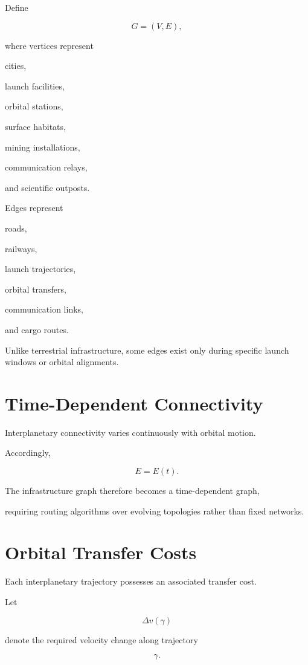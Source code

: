 \documentclass[11pt,fleqn]{book}
\numberwithin{equation}{chapter}
\theoremstyle{plain}
\theoremstyle{definition}
\theoremstyle{remark}
\begin{document}
Define

\[
G=(V,E),
\]

where vertices represent

cities,

launch facilities,

orbital stations,

surface habitats,

mining installations,

communication relays,

and scientific outposts.

Edges represent

roads,

railways,

launch trajectories,

orbital transfers,

communication links,

and cargo routes.

Unlike terrestrial infrastructure, some edges exist only during
specific launch windows or orbital alignments.


\section{Time-Dependent Connectivity}

Interplanetary connectivity varies continuously with orbital motion.

Accordingly,

\[
E=E(t).
\]

The infrastructure graph therefore becomes a time-dependent graph,

requiring routing algorithms over evolving topologies rather than fixed
networks.


\section{Orbital Transfer Costs}

Each interplanetary trajectory possesses an associated transfer cost.

Let

\[
\Delta v(\gamma)
\]

denote the required velocity change along trajectory

\[
\gamma.
\]
\end{document}
